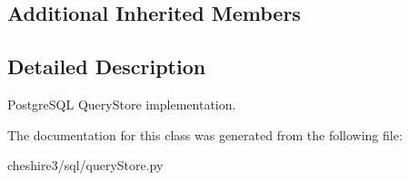 \subsection*{Additional Inherited Members}


\subsection{Detailed Description}
\begin{DoxyVerb}PostgreSQL QueryStore implementation.\end{DoxyVerb}
 

The documentation for this class was generated from the following file\-:\begin{DoxyCompactItemize}
\item 
cheshire3/sql/query\-Store.\-py\end{DoxyCompactItemize}
